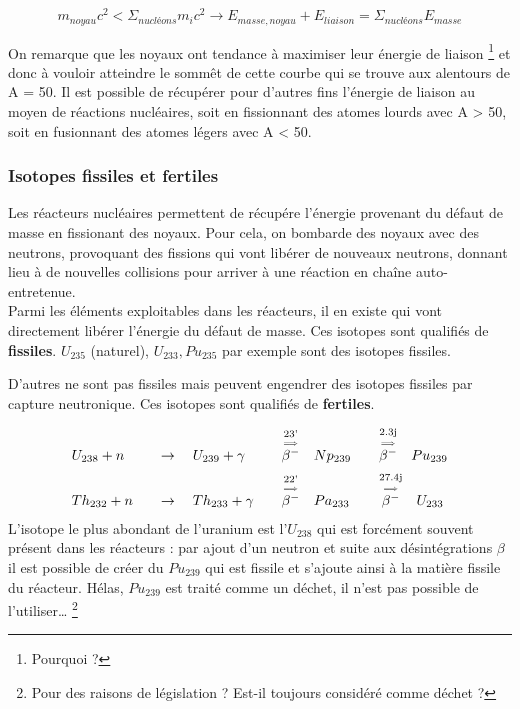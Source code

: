 \begin{equation}
m_{noyau} c^2 < \Sigma_{nucléons} m_i c^2 \rightarrow E_{masse, noyau} + E_{liaison} = \Sigma_{nucléons} E_{masse}
\end{equation}

On remarque que les noyaux ont tendance à maximiser leur énergie de liaison 
\footnote{Pourquoi ?} et donc à
vouloir atteindre le sommêt de cette courbe qui se trouve aux alentours de A = 50.
Il est possible de récupérer pour d'autres fins l'énergie de liaison au moyen de réactions nucléaires, soit
en fissionnant des atomes lourds avec A > 50, soit en fusionnant des atomes légers avec A < 50.

\subsubsection{Isotopes fissiles et fertiles}
Les réacteurs nucléaires permettent de récupére l'énergie provenant du défaut de masse en fissionant des
noyaux. Pour cela, on bombarde des noyaux avec des neutrons, provoquant des fissions qui vont libérer
de nouveaux neutrons, donnant lieu à de nouvelles collisions pour arriver à une réaction en chaîne
auto-entretenue.\\

Parmi les éléments exploitables dans les réacteurs, il en existe qui vont directement libérer l'énergie
du défaut de masse. Ces isotopes sont qualifiés de \textbf{fissiles}. $U_{235}$ (naturel), 
$U_{233}, Pu_{235}$ par exemple sont des isotopes fissiles.

D'autres ne sont pas fissiles mais peuvent engendrer des isotopes fissiles par capture neutronique.
Ces isotopes sont qualifiés de \textbf{fertiles}.

\begin{equation}
\begin{array}{llll}
U_{238} + n\quad&\to\quad U_{239}+\gamma\quad&\overset{\underset{\Longrightarrow}{\text{23'}}}{\beta^-}\quad Np_{239}\quad&\overset{\underset{\Longrightarrow}{\text{2.3j}}}{\beta^-}\quad Pu_{239}
\vspace{2mm}\\
Th_{232} + n\quad&\to\quad Th_{233}+\gamma\quad&\overset{\underset{\Longrightarrow}{\text{22'}}}{\beta^-}\quad Pa_{233}\quad&\overset{\underset{\Longrightarrow}{\text{27.4j}}}{\beta^-}\quad U_{233}
\end{array}
\end{equation}
L'isotope le plus abondant de l'uranium est l'$U_{238}$ qui est forcément souvent présent dans 
les réacteurs : par ajout d'un neutron  et suite aux désintégrations $\beta$ il est possible de
créer du $Pu_{239}$ qui est fissile et s'ajoute ainsi à la matière fissile du réacteur. Hélas, 
$Pu_{239}$ est traité comme un déchet, il n'est pas possible de l'utiliser\dots
\footnote{Pour des raisons de législation ? Est-il toujours considéré comme déchet ?}\\

